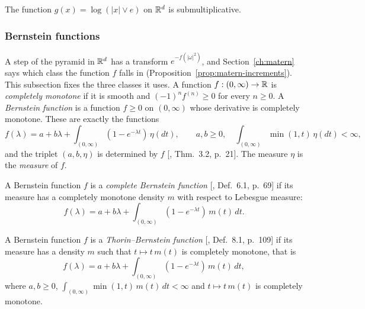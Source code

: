 \begin{theorem}
\label{thm:cited-A50}

The function $g(x) = \log(|x| \vee e)$ on $\mathbb{R}^d$ is submultiplicative.
\end{theorem}

\subsubsection{Bernstein functions}
\label{subsec:cited-bernstein}

A step of the \Matern{} pyramid in $\mathbb{R}^d$ has a transform $e^{-f(|\omega|^2)}$, and
Section~\ref{ch:matern} says which class the function $f$ falls in
(Proposition~\ref{prop:matern-increments}). This subsection fixes the three classes it uses. A
function $f : (0,\infty) \to \mathbb{R}$ is \emph{completely monotone} if it is smooth
and $(-1)^nf^{(n)} \ge 0$ for every $n \ge 0$. A \emph{Bernstein function} is a
function $f \ge 0$ on $(0,\infty)$ whose derivative is completely monotone. These are exactly the
functions
\[
  f(\lambda) = a + b\lambda + \int_{(0,\infty)}(1 - e^{-\lambda t})\,\eta(dt), \qquad a, b \ge 0,
  \quad \int_{(0,\infty)}\min(1, t)\,\eta(dt) < \infty,
\]
and the triplet $(a, b, \eta)$ is determined by $f$ [, Thm.~3.2,
p.~21]. The measure $\eta$ is the \emph{\Levy{} measure} of $f$.

\begin{definition}
\label{def:complete-bernstein}

A Bernstein function $f$ is a \emph{complete Bernstein function}
[, Def.~6.1, p.~69] if its \Levy{} measure has a
completely monotone density $m$ with respect to Lebesgue measure:
\[
  f(\lambda) = a + b\lambda + \int_{(0,\infty)}(1 - e^{-\lambda t})\,m(t)\,dt .
\]
\end{definition}

\begin{definition}
\label{def:thorin-bernstein}

A Bernstein function $f$ is a \emph{Thorin--Bernstein function}
[, Def.~8.1, p.~109] if its \Levy{} measure has a density
$m$ such that $t \mapsto t\,m(t)$ is completely monotone, that is
\[
  f(\lambda) = a + b\lambda + \int_{(0,\infty)}(1 - e^{-\lambda t})\,m(t)\,dt,
\]
where $a, b \ge 0$, $\int_{(0,\infty)}\min(1, t)\,m(t)\,dt < \infty$ and $t \mapsto t\,m(t)$ is
completely monotone.
\end{definition}

